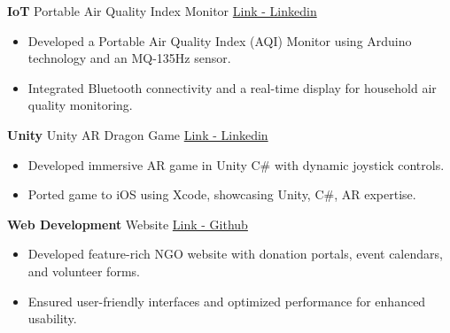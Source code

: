 \documentclass[9pt]{developercv} %
\begin{document}
\vspace{-22pt}

\begin{entrylist}
    \entry
        {\textbf{IoT}}
        {Portable Air Quality Index Monitor}
        {\href{https://www.linkedin.com/posts/yash-siwach_iot-airquality-smarthome-activity-7207296630738341889-wHXx?utm_source=share&utm_medium=member_desktop}{Link - Linkedin}}
        {\vspace{-\topsep} %
        \begin{itemize}[noitemsep,topsep=0pt,parsep=0pt,partopsep=0pt,leftmargin=-1pt]
            \item Developed a Portable Air Quality Index (AQI) Monitor using Arduino technology and an MQ-135Hz sensor.
            \item Integrated Bluetooth connectivity and a real-time display for household air quality monitoring.
        \end{itemize}}
    \entry
        {\textbf{Unity}}
        {Unity AR Dragon Game}
        {\href{https://www.linkedin.com/feed/update/urn:li:activity:7193535905696018432/}{Link - Linkedin}}
        {\vspace{-\topsep} %
        \begin{itemize}[noitemsep,topsep=0pt,parsep=0pt,partopsep=0pt,leftmargin=-1pt]
            \item Developed immersive AR game in Unity C\# with dynamic joystick controls.
            \item Ported game to iOS using Xcode, showcasing Unity, C\#, AR expertise.
        \end{itemize}}
    \entry
        {\textbf{Web Development}}
        {Website}
        {\href{https://github.com/Iamyashsiwach/SmileFoundationSociety_website.git}{Link - Github}}
        {\vspace{-\topsep} %
        \begin{itemize}[noitemsep,topsep=0pt,parsep=0pt,partopsep=0pt,leftmargin=-1pt]
            \item Developed feature-rich NGO website with donation portals, event calendars, and volunteer forms.
            \item Ensured user-friendly interfaces and optimized performance for enhanced usability.

\end{itemize}}
\end{entrylist}
\end{document}
